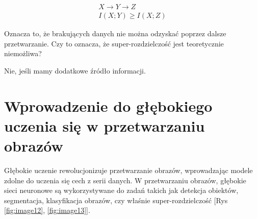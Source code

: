 \begin{equation}
    \begin{gathered}
    X \rightarrow Y \rightarrow Z \\
    I(X ; Y) \geq I(X ; Z)
    \end{gathered}
\end{equation}

Oznacza to, że brakujących danych nie można odzyskać poprzez dalsze przetwarzanie. Czy to oznacza, że super-rozdzielczość jest teoretycznie niemożliwa? 

Nie, jeśli mamy dodatkowe źródło informacji. 


\section{Wprowadzenie do głębokiego uczenia się w przetwarzaniu obrazów}

Głębokie uczenie rewolucjonizuje przetwarzanie obrazów, wprowadzając modele zdolne do uczenia się cech z serii danych. W przetwarzaniu obrazów, głębokie sieci neuronowe są wykorzystywane do zadań takich jak detekcja obiektów, segmentacja, klasyfikacja obrazów, czy właśnie super-rozdzielczość [Rys \ref{fig:image12},  \ref{fig:image13}].

